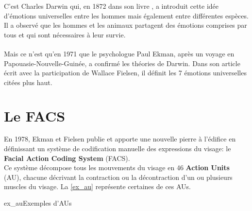 \documentclass[poster]{polytech/polytech}
\begin{document}
C'est Charles Darwin qui, en 1872 dans son livre \cite{darwin}, a introduit cette idée d'émotions universelles entre les hommes mais également entre différentes espèces. Il a observé que les hommes et les animaux partagent des émotions comprises par tous et qui sont nécessaires à leur survie.\\
\\
Mais ce n'est qu'en 1971 que le psychologue Paul Ekman, après un voyage en Papouasie-Nouvelle-Guinée, a confirmé les théories de Darwin. Dans son article \cite{ekman} écrit avec la participation de Wallace Fielsen, il définit les 7 émotions universelles citées plus haut.\\

\section{Le FACS}
\label{sec:facs}

En 1978, Ekman et Fielsen publie \cite{ekman2} et apporte une nouvelle pierre à l'édifice en définissant un système de codification manuelle des expressions du visage: le \textbf{Facial Action Coding System} (FACS).\\
Ce système décompose tous les mouvements du visage en 46 \textbf{Action Units} (AU), chacune décrivant la contraction ou la décontraction d'un ou plusieurs muscles du visage. La \autoref{ex_au} représente certaines de ces AUs.\\

\begin{Figure}{ex_au}{Exemples d'AUs}
\end{Figure}
\end{document}
